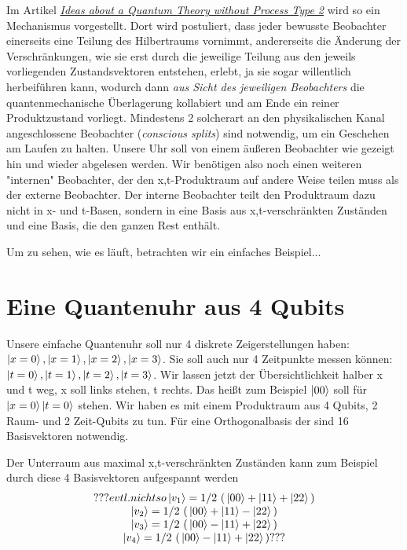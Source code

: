 \documentclass[12pt]{article}
\begin{document}
Im Artikel \emph{\href{https://docs.google.com/document/d/1OrmVETmnBSe5c0CpTbKH8Vq5pWFuB8QUez-KqHTaarQ/edit?usp=sharing}{Ideas about a Quantum Theory without Process Type 2}} wird so ein Mechanismus vorgestellt. Dort wird postuliert, dass jeder bewusste Beobachter einerseits eine Teilung des Hilbertraums vornimmt, andererseits die Änderung der Verschränkungen, wie sie erst durch die jeweilige Teilung aus den jeweils vorliegenden Zustandsvektoren entstehen, erlebt, ja sie sogar willentlich herbeiführen kann, wodurch dann \emph{aus Sicht des jeweiligen Beobachters} die quantenmechanische Überlagerung kollabiert und am Ende ein reiner Produktzustand vorliegt. Mindestens 2 solcherart an den physikalischen Kanal angeschlossene Beobachter (\emph{conscious splits}) sind notwendig, um ein Geschehen am Laufen zu halten. Unsere Uhr soll von einem äußeren Beobachter wie gezeigt hin und wieder abgelesen werden. Wir benötigen also noch einen weiteren "internen" Beobachter, der den x,t-Produktraum auf andere Weise teilen muss als der externe Beobachter. Der interne Beobachter teilt den Produktraum dazu nicht in x- und t-Basen, sondern in eine Basis aus x,t-verschränkten Zuständen und eine Basis, die den ganzen Rest enthält.

Um zu sehen, wie es läuft, betrachten wir ein einfaches Beispiel...

\section{Eine Quantenuhr aus 4 Qubits}

Unsere einfache Quantenuhr soll nur 4 diskrete Zeigerstellungen haben: $\ket{x=0}, \ket{x=1}, \ket{x=2}, \ket{x=3}$. Sie soll auch nur 4 Zeitpunkte messen können: $\ket{t=0}, \ket{t=1}, \ket{t=2}, \ket{t=3}$. Wir lassen jetzt der Übersichtlichkeit halber x und t weg, x soll links stehen, t rechts. Das heißt zum Beispiel $\ket{00}$ soll für $\ket{x=0}\ket{t=0}$ stehen. Wir haben es mit einem Produktraum aus 4 Qubits, 2 Raum- und 2 Zeit-Qubits zu tun. Für eine Orthogonalbasis der sind 16 Basisvektoren notwendig.

Der Unterraum aus maximal x,t-verschränkten Zuständen kann zum Beispiel durch diese 4 Basisvektoren aufgespannt werden
\begin{equation}
\begin{matrix}
??? evtl. nicht so
\ket{v_1} = {1}/{2} \, \left(\, \ket{00} + \ket{11} + \ket{22} \,\right) \\
\ket{v_2} = {1}/{2} \, \left(\, \ket{00} + \ket{11} - \ket{22} \,\right) \\
\ket{v_3} = {1}/{2} \, \left(\, \ket{00} - \ket{11} + \ket{22} \,\right) \\
\ket{v_4} = {1}/{2} \, \left(\, \ket{00} - \ket{11} + \ket{22} \,\right) ???
\end{matrix}
\end{equation}
\end{document}
